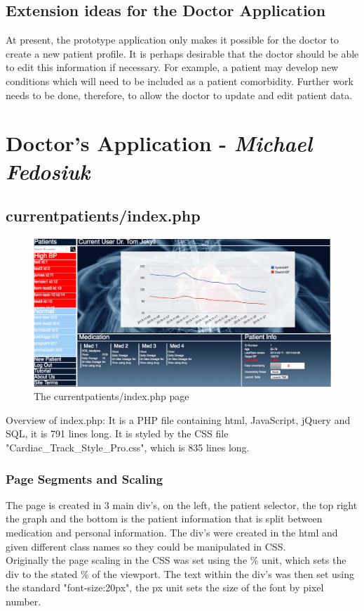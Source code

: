 \documentclass[11pt]{article}
\begin{document}

\subsection{Extension ideas for the Doctor Application}
At present, the prototype application only makes it possible for the doctor to create a new patient profile. It is perhaps desirable that the doctor should be able to edit this information if necessary. For example, a patient may develop new conditions which will need to be included as a patient comorbidity. Further work needs to be done, therefore, to allow the doctor to update and edit patient data.

\clearpage

\section{Doctor's Application - \textit{Michael Fedosiuk}}
\subsection{currentpatients/index.php}
\begin{figure}[h!] 
\includegraphics[width=\linewidth]{indexover.png}
\caption{The currentpatients/index.php page \label{indexover}}
\end{figure} 
\noindent 
Overview of index.php: It is a PHP file containing html, JavaScript, jQuery and SQL, it is 791 lines long. It is styled by the CSS file "Cardiac\_Track\_Style\_Pro.css", which is 835 lines long. 
\subsubsection{Page Segments and Scaling}
The page is created in 3 main div's, on the left, the patient selector, the top right the graph and the bottom is the patient information that is split between medication and personal information. The div's were created in the html and given different class names so they could be manipulated in CSS. 
\\ \indent
Originally the page scaling in the CSS was set using the \% unit, which sets the div to the stated \% of the viewport. The text within the div's was then set using the standard "font-size:20px", the px unit sets the size of the font by pixel number. 
\end{document}
